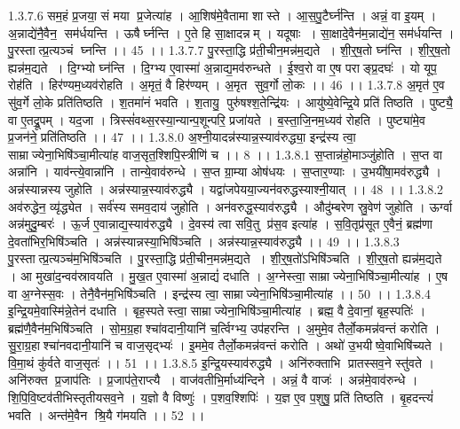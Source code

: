 1.3.7.6
सम॒हं प्र॒जया॒ सं मया प्र॒जेत्या॑ह । आ॒शिष॑मे॒वैतामा शास्ते । आ॒स॒पु॒टैर्घ्न॑न्ति । अन्नं॒ वा इ॒यम् । अ॒न्नाद्ये॑नै॒वैन॒॒ सम॑र्धयन्ति । ऊषैर्घ्नन्ति । ए॒ते हि सा॒क्षादन्नम् । यदूषाः । सा॒क्षादे॒वैन॑म॒न्नाद्ये॑न॒ सम॑र्धयन्ति । पु॒रस्तात्प्र॒त्यञ्चं घ्नन्ति ।। 45 ।।
1.3.7.7
पु॒रस्ता॒द्धि प्र॑ती॒चीन॒मन्न॑म॒द्यते । शी॒र्॒ष॒तो घ्न॑न्ति । शी॒र्॒ष॒तो ह्यन्न॑म॒द्यते । दि॒ग्भ्यो घ्न॑न्ति । दि॒ग्भ्य ए॒वास्मा॑ अ॒न्नाद्य॒मव॑रुन्धते । ई॒श्व॒रो वा ए॒ष पराङ्प्र॒दघः॑ । यो यूप॒॒ रोह॑ति । हिर॑ण्यम॒ध्यव॑रोहति । अ॒मृतं॒ वै हिर॑ण्यम् । अ॒मृत॑ सुव॒र्गो लो॒कः ।। 46 ।।
1.3.7.8
अ॒मृत॑ ए॒व सु॑व॒र्गे लो॒के प्रति॑तिष्ठति । श॒तमा॑नं भवति । श॒तायु॒ पुरु॑षश्श॒तेन्द्रि॑यः । आयु॑ष्ये॒वेन्द्रि॒ये प्रति॑ तिष्ठति । पुष्ट्यै॒ वा ए॒तद्रू॒पम् । यद॒जा । त्रिस्सं॑वथ्स॒रस्या॒न्यान्प॒शून्परि॒ प्रजा॑यते । ब॒स्ता॒जि॒नम॒ध्यव॑ रोहति । पुष्ट्या॑मे॒व प्र॒जन॑ने॒ प्रति॑तिष्ठति ।। 47 ।।
1.3.8.0
अ॒श्नी॒यादन्न॑स्यान्न॒स्याव॑रुद्ध्या॒ इन्द्र॑स्य त्वा॒ साम्राज्येना॒भिषि॑ञ्चा॒मीत्या॑ह वाज॒सृत॒श्शिपि॒स्त्रीणि॑ च ।। 8 ।।
1.3.8.1
स॒प्तान्न॑हो॒माञ्जु॑होति । स॒प्त वा अन्ना॑नि । याव॑न्त्ये॒वान्ना॑नि । तान्ये॒वाव॑रुन्धे । स॒प्त ग्रा॒म्या ओष॑धयः । स॒प्तार॒ण्याः । उ॒भयी॑षा॒मव॑रुद्ध्यै । अन्न॑स्यान्नस्य जुहोति । अन्न॑स्यान्न॒स्याव॑रुद्ध्यै । यद्वा॑जपेयया॒ज्यन॑वरुद्धस्याश्नी॒यात् ।। 48 ।।
1.3.8.2
अव॑रुद्धेन॒ व्यृ॑द्ध्येत । सर्व॑स्य समव॒दाय॑ जुहोति । अन॑वरुद्ध॒स्याव॑रुद्ध्यै । औदु॑म्बरेण स्रु॒वेण॑ जुहोति । ऊर्ग्वा अन्न॑मुदु॒म्बरः॑ । ऊ॒र्ज ए॒वान्नाद्य॒स्याव॑रुद्ध्यै । दे॒वस्य॑ त्वा सवि॒तु प्र॑स॒व इत्या॑ह । स॒वि॒तृप्र॑सूत ए॒वैनं॒ ब्रह्म॑णा दे॒वता॑भिर॒भिषि॑ञ्चति । अन्न॑स्यान्नस्या॒भिषि॑ञ्चति । अन्न॑स्यान्न॒स्याव॑रुद्ध्यै ।। 49 ।।
1.3.8.3
पु॒रस्तात्प्र॒त्यञ्च॑म॒भिषि॑ञ्चति । पु॒रस्ता॒द्धि प्र॑ती॒चीन॒मन्न॑म॒द्यते । शी॒र्॒ष॒तो॑ऽभिषि॑ञ्चति । शी॒र्॒ष॒तो ह्यन्न॑म॒द्यते । आ मुखा॑द॒न्वव॑स्रावयति । मु॒ख॒त ए॒वास्मा॑ अ॒न्नाद्यं॑ दधाति । अ॒ग्नेस्त्वा॒ साम्राज्येना॒भिषि॑ञ्चा॒मीत्या॑ह । ए॒ष वा अ॒ग्नेस्स॒वः । तेनै॒वैन॑म॒भिषि॑ञ्चति । इन्द्र॑स्य त्वा॒ साम्राज्येना॒भिषि॑ञ्चा॒मीत्या॑ह ।। 50 ।।
1.3.8.4
इ॒न्द्रि॒यमे॒वास्मि॑न्ने॒तेन॑ दधाति । बृह॒स्पतेस्त्वा॒ साम्राज्येना॒भिषि॑ञ्चा॒मीत्या॑ह । ब्रह्म॒ वै दे॒वानां॒ बृह॒स्पतिः॑ । ब्रह्म॑णै॒वैन॑म॒भिषि॑ञ्चति । सो॒म॒ग्र॒हाश्चा॑वदानी॒यानि॑ च॒र्त्विग्भ्य॒ उप॑हरन्ति । अ॒मुमे॒व तैर्लो॒कमन्न॑वन्तं करोति । सु॒रा॒ग्र॒हाश्चा॑नवदानी॒यानि॑ च वाज॒सृद्भ्यः॑ । इ॒ममे॒व तैर्लो॒कमन्न॑वन्तं करोति । अथो॑ उ॒भयीष्वे॒वाभिषि॑च्यते । वि॒मा॒थं कु॑र्वते वाज॒सृतः॑ ।। 51 ।।
1.3.8.5
इ॒न्द्रि॒यस्याव॑रुद्ध्यै । अनि॑रुक्ताभि प्रातस्सव॒ने स्तु॑वते । अनि॑रुक्त प्र॒जाप॑तिः । प्र॒जाप॑ते॒राप्त्यै । वाज॑वतीभि॒र्माध्य॑न्दिने । अन्नं॒ वै वाजः॑ । अन्न॑मे॒वाव॑रुन्धे । शि॒पि॒वि॒ष्टव॑तीभिस्तृतीयसव॒ने । य॒ज्ञो वै विष्णुः॑ । प॒शव॒श्शिपिः॑ । य॒ज्ञ ए॒व प॒शुषु॒ प्रति॑ तिष्ठति । बृ॒हदन्त्यं॑ भवति । अन्त॑मे॒वैन॑ श्रि॒यै ग॑मयति ।। 52 ।।
